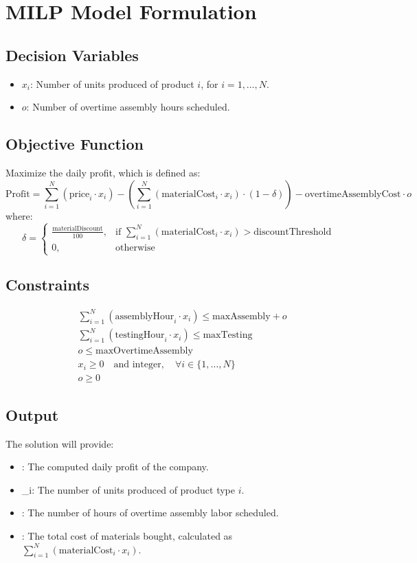 \documentclass{article}
\begin{document}
\section*{MILP Model Formulation}

\subsection*{Decision Variables}
\begin{itemize}
    \item $x_i$: Number of units produced of product $i$, for $i = 1, \ldots, N$.
    \item $o$: Number of overtime assembly hours scheduled.
\end{itemize}

\subsection*{Objective Function}
Maximize the daily profit, which is defined as:
\[
\text{Profit} = \sum_{i=1}^{N} (\text{price}_i \cdot x_i) - \left(\sum_{i=1}^{N} (\text{materialCost}_i \cdot x_i) \cdot (1 - \delta) \right) - \text{overtimeAssemblyCost} \cdot o
\]
where:
\[
\delta = 
\begin{cases}
\frac{\text{materialDiscount}}{100}, & \text{if } \sum_{i=1}^{N} (\text{materialCost}_i \cdot x_i) > \text{discountThreshold} \\
0, & \text{otherwise}
\end{cases}
\]

\subsection*{Constraints}
\begin{align}
    & \sum_{i=1}^{N} (\text{assemblyHour}_i \cdot x_i) \leq \text{maxAssembly} + o \\
    & \sum_{i=1}^{N} (\text{testingHour}_i \cdot x_i) \leq \text{maxTesting} \\
    & o \leq \text{maxOvertimeAssembly} \\
    & x_i \geq 0 \quad \text{and integer}, \quad \forall i \in \{1, \ldots, N\} \\
    & o \geq 0
\end{align}

\subsection*{Output}
The solution will provide:
\begin{itemize}
    \item {}: The computed daily profit of the company.
    \item {}_i: The number of units produced of product type $i$.
    \item {}: The number of hours of overtime assembly labor scheduled.
    \item {}: The total cost of materials bought, calculated as $\sum_{i=1}^{N} (\text{materialCost}_i \cdot x_i)$.
\end{itemize}
\end{document}
